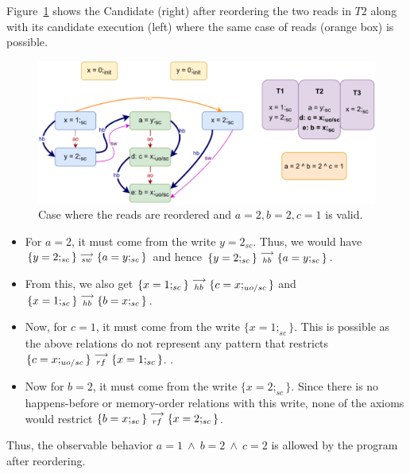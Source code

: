        Figure~\ref{reord_counter:example1(b)} shows the Candidate (right) after reordering the two reads in $T2$ along with its candidate execution (left) where the same case of reads (orange box) is possible. 
        \begin{figure}[H]
            \centering
            \includegraphics[scale=0.7]{7.CounterExamples/ReorderingCandidate/Example0R(Rsc-Ruo,sc).pdf}
            \caption{Case where the reads are reordered and $a = 2 , b = 2, c = 1$ is valid.}
            \label{reord_counter:example1(b)}
        \end{figure}

        \begin{itemize}
            \item For $a=2$, it must come from the write $y=2_{sc}$. 
            Thus, we would have $\{y=2;_{sc}\}\stackrel{\longrightarrow}{_{sw}}\{a=y;_{sc}\}$ and hence $\{y=2;_{sc}\}\stackrel{\longrightarrow}{_{hb}}\{a=y;_{sc}\}$.
            \item From this, we also get $\{x=1;_{sc}\}\stackrel{\longrightarrow}{_{hb}}\{c=x;_{uo/sc}\}$ and $\{x=1;_{sc}\}\stackrel{\longrightarrow}{_{hb}}\{b=x;_{sc}\}$.
            \item Now, for $c=1$, it must come from the write $\{x=1;_{sc}\}$. 
            This is possible as the above relations do not represent any pattern that restricts $\{c=x;_{uo/sc}\}\stackrel{\longrightarrow}{_{rf}}\{x=1;_{sc}\}$. .  
            \item Now for $b=2$, it must come from the write $\{x=2;_{sc}\}$.
            Since there is no happens-before or memory-order relations with this write, none of the axioms would restrict $\{b=x;_{sc}\}\stackrel{\longrightarrow}{_{rf}}\{x=2;_{sc}\}$.        
        \end{itemize}
        Thus, the observable behavior $a=1 \ \wedge \ b=2 \ \wedge \ c=2$ is allowed by the program after reordering. 
        
    
